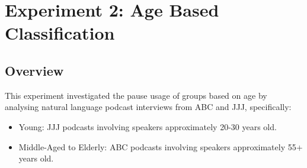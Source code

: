 \section{Experiment 2: Age Based Classification}
\subsection{Overview}
This experiment investigated the pause usage of groups based on age by analysing natural language podcast interviews from ABC and JJJ, specifically: 

\begin{itemize}
\item Young: JJJ podcasts involving speakers approximately 20-30 years old.
\item Middle-Aged to Elderly: ABC podcasts involving speakers approximately 55+ years old.
\end{itemize}











